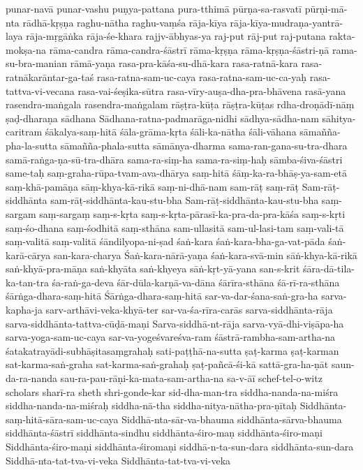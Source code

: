 {punar-navā
punar-vashu
puṇya-pattana
pura-tthimā
    pūrṇa-sa-rasvatī
pūrṇi-mā-nta
rādhā-kṛṣṇa
raghu-nātha
raghu-vaṃśa
rāja-kīya
rāja-kīya-mudraṇa-yantrā-laya
rāja-mṛgāṅka
rāja-śe-khara
rajjv-ābhyas-ya
raj-put
rāj-put
raj-putana
rakta-mokṣa-na
rāma-candra
rāma-candra-śāstrī
rāma-kṛṣṇa
rāma-kṛṣṇa-śāstri-ṇā
rama-su-bra-manian
rāmā-yaṇa
rasa-pra-kāśa-su-dhā-kara
rasa-ratnā-kara
rasa-ratnākarāntar-ga-taś
rasa-ratna-sam-uc-caya
rasa-ratna-sam-uc-ca-yaḥ
rasa-tattva-vi-vecana
    rasa-vai-śeṣika-sūtra
rasa-vīry-auṣa-dha-pra-bhāvena
rasā-yana
rasendra-maṅgala
rasendra-maṅgalam
rāṣṭra-kūṭa
rāṣṭra-kūṭas
    rdha-droṇādī-nāṃ
ṣaḍ-dharaṇa
sādhana
Sādhana-ratna-padmarāga-nidhi
    sādhya-sādha-nam
sāhitya-caritram 
śākalya-saṃ-hitā
śāla-grāma-kṛta
    śāli-ka-nātha
śāli-vāhana
sāmañña-pha-la-sutta
sāmañña-phala-sutta
sāmānya-dharma
sama-ran-gana-su-tra-dhara
samā-raṅga-ṇa-sū-tra-dhāra
sama-ra-siṃ-ha
sama-ra-siṃ-haḥ
sāmba-śiva-śāstri
same-taḥ
saṃ-graha-rūpa-tvam-ava-dhārya
saṃ-hitā
śāṃ-ka-ra-bhāṣ-ya-sam-etā
saṃ-khā-pamāṇa
    sāṃ-khya-kā-rikā
    saṃ-ni-dhā-nam
sam-rāṭ
saṃ-rāṭ
Sam-rāṭ-siddhānta
sam-rāṭ-siddhānta-kau-stu-bha
Sam-rāṭ-siddhānta-kau-stu-bha
saṃ-sargam
saṃ-sargaṃ
saṃ-s-kṛta
saṃ-s-kṛta-pārasī-ka-pra-da-pra-kāśa
saṃ-s-kṛti 
saṃ-śo-dhana
saṃ-śodhitā
saṃ-sthāna
sam-ullasitā
sam-ul-lasi-tam
    saṃ-vali-tā
    saṃ-valitā
saṃ-valitā
śāndilyopa-ni-ṣad
śaṅ-kara
śaṅ-kara-bha-ga-vat-pāda
śaṅ-karā-cārya
san-kara-charya
Śaṅ-kara-nārā-yaṇa
    śaṅ-kara-svā-min
    sāṅ-khya-kā-rikā
saṅ-khyā-pra-māṇa
saṅ-khyāta
saṅ-khyeya
sāṅ-kṛt-yā-yana
san-s-krit
śāra-dā-tila-ka-tan-tra
śa-raṅ-ga-deva
śār-dūla-karṇā-va-dāna
    śārīra-sthāna
śā-rī-ra-sthāna
śārṅga-dhara-saṃ-hitā
Śārṅga-dhara-saṃ-hitā
sar-va-dar-śana-saṅ-gra-ha
sarva-kapha-ja
sarv-arthāvi-veka-khyā-ter
sar-va-śa-rīra-carās
sarva-siddhānta-rāja
sarva-siddhānta-tattva-cūḍā-maṇi
Sarva-siddhā-nt-rāja
sarva-vyā-dhi-viṣāpa-ha
sarva-yoga-sam-uc-caya
sar-va-yogeśvareśva-ram
śāstrā-rambha-sam-artha-na
śatakatrayādi-subhāṣitasaṃgrahaḥ
sati-paṭṭhā-na-sutta
ṣaṭ-karma
ṣaṭ-karman
sat-karma-saṅ-graha
sat-karma-saṅ-grahaḥ
ṣaṭ-pañcā-śi-kā
    sattā-gra-ha-ṇāt
saun-da-ra-nanda
sau-ra-pau-rāṇi-ka-mata-sam-artha-na
sa-v-āī
schef-tel-o-witz
scholars
sharī-ra
sheth
shri-gonde-kar
sid-dha-man-tra
siddha-nanda-na-miśra
siddha-nanda-na-miśraḥ
siddha-nā-tha
siddha-nitya-nātha-pra-ṇītaḥ
Siddhānta-saṃ-hitā-sāra-sam-uc-caya
Siddhā-nta-sār-va-bhauma
siddhānta-sārva-bhauma
siddhānta-śāstrī
siddhānta-sindhu
siddhānta-śiro-maṇ
siddhānta-śiro-maṇi
Siddhānta-śiro-maṇi
siddhānta-śiromaṇi
siddhā-n-ta-sun-dara
siddhānta-sun-dara
Siddhā-nta-tat-tva-vi-veka
Siddhānta-tat-tva-vi-veka
}
